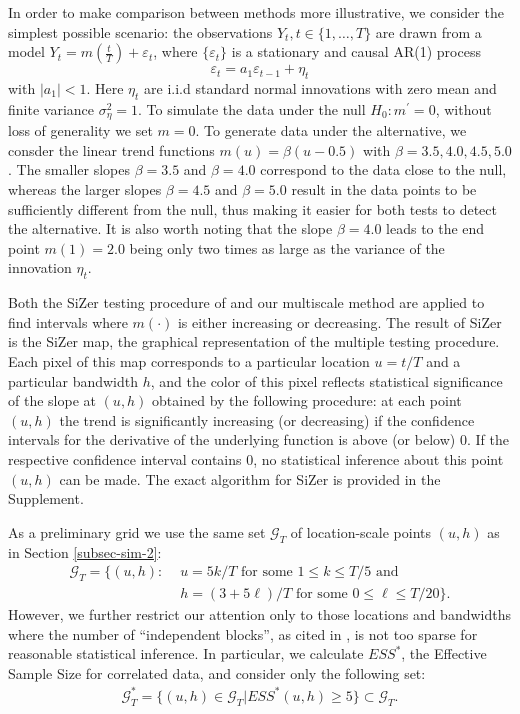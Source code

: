 \documentclass[a4paper,12pt]{article}
\begin{document}
In order to make comparison between methods more illustrative, we consider the simplest possible scenario: the observations $Y_t, t \in \{1, \ldots, T\}$ are drawn from a model $Y_t = m(\frac{t}{T}) + \varepsilon_t$, where $\{\varepsilon_t\}$ is a stationary and causal AR(1) process
\[ \varepsilon_t = a_1 \varepsilon_{t - 1} + \eta_t
\]
with $|a_1| < 1$. Here $\eta_t$ are i.i.d standard normal innovations with zero mean and finite variance $\sigma_\eta^2 = 1$. To simulate the data under the null $H_0: m^\prime = 0$, without loss of generality we set $ m = 0$. To generate data under the alternative, we consder the linear trend functions $m(u) = \beta (u - 0.5)$ with $\beta = 3.5, 4.0, 4.5, 5.0$. The smaller slopes $\beta = 3.5$ and $\beta = 4.0$ correspond to the data close to the null, whereas the larger slopes $\beta = 4.5$ and $\beta = 5.0$ result in the data points to be sufficiently different from the null, thus making it easier for both tests to detect the alternative. It is also worth noting that the slope $\beta = 4.0$ leads to the end point $m(1) = 2.0$ being only two times as large as the variance of the innovation $\eta_t$.
 
Both the SiZer testing procedure of \cite{Rondonotti2007} and our multiscale method are applied to find intervals where $m(\cdot)$ is either increasing or decreasing. The result of SiZer is the SiZer map, the graphical representation of the multiple testing procedure. Each pixel of this map corresponds to a particular location $u = t/T$ and a particular bandwidth $h$, and the color of this pixel reflects statistical significance of the slope at $(u, h)$ obtained by the following procedure: at each point $(u, h)$ the trend is significantly increasing (or decreasing) if the confidence intervals for the derivative of the underlying function is above (or below) $0$. If the respective confidence interval contains $0$, no statistical inference about this point $(u, h)$ can be made. The exact algorithm for SiZer is provided in the Supplement. 

As a preliminary grid we use the same set $\mathcal{G}_T$ of location-scale points $(u,h)$ as in Section \ref{subsec-sim-2}:
\begin{align}
\mathcal{G}_T = \big\{ (u, h): & \, \, u = 5k/T \text{ for some } 1 \le k \le T/5 \text{ and } \nonumber \\ & \, \, h = (3+5\ell)/T \text{ for some } 0 \le \ell \le T/20 \big\}.
\end{align}
However, we further restrict our attention only to those locations and bandwidths where the number of ``independent blocks'', as cited in \cite{Rondonotti2007}, is not too sparse for reasonable statistical inference. In particular, we calculate $ESS^*$, the Effective Sample Size for correlated data, and consider only the following set:
\begin{align}
\mathcal{G}_T^*  = \big\{ (u, h)\in \mathcal{G}_T| ESS^*(u, h) \geq 5\}\subset \mathcal{G}_T.
\end{align}
\end{document}
